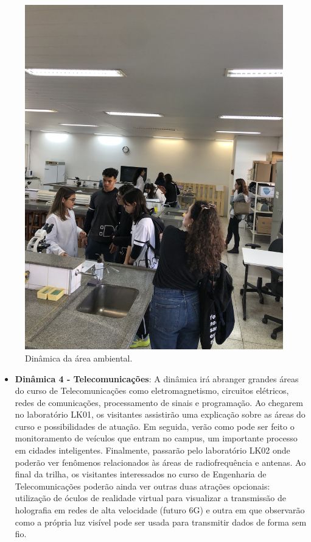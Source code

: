 \documentclass[
  letterpaper,
  DIV=11,
  numbers=noendperiod]{scrreprt}
\providecommand{\tightlist}{%
  \setlength{\itemsep}{0pt}\setlength{\parskip}{0pt}}\usepackage{longtable,booktabs,array}
\begin{document}
\begin{figure}[H]

{\centering \includegraphics[width=0.6\linewidth,height=\textheight,keepaspectratio]{planejamento/dinamica-ambiental.jpg}

}

\caption{Dinâmica da área ambiental.}

\end{figure}%

\begin{itemize}
\tightlist
\item
  \textbf{Dinâmica 4 - Telecomunicações}: A dinâmica irá abranger
  grandes áreas do curso de Telecomunicações como eletromagnetismo,
  circuitos elétricos, redes de comunicações, processamento de sinais e
  programação. Ao chegarem no laboratório LK01, os visitantes assistirão
  uma explicação sobre as áreas do curso e possibilidades de atuação. Em
  seguida, verão como pode ser feito o monitoramento de veículos que
  entram no campus, um importante processo em cidades inteligentes.
  Finalmente, passarão pelo laboratório LK02 onde poderão ver fenômenos
  relacionados às áreas de radiofrequência e antenas. Ao final da
  trilha, os visitantes interessados no curso de Engenharia de
  Telecomunicações poderão ainda ver outras duas atrações opcionais:
  utilização de óculos de realidade virtual para visualizar a
  transmissão de holografia em redes de alta velocidade (futuro 6G) e
  outra em que observarão como a própria luz visível pode ser usada para
  transmitir dados de forma sem fio.
\end{itemize}
\end{document}
